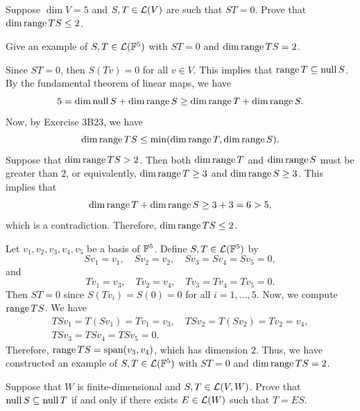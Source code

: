 \begin{exc}
\begin{exercise}\leavevmode
\begin{parts}
\item Suppose $\dim V=5$ and $S,T\in\mathcal{L}(V)$ are such that $ST=0$. Prove that
  $\operatorname{dim}\operatorname{range} TS\le2$.
\item Give an example of $S,T\in\mathcal{L}(\mathbb{F}^5)$ with $ST=0$ and
  $\operatorname{dim}\operatorname{range} TS=2$.
\end{parts}
\end{exercise}
\begin{solution}\leavevmode
\begin{parts}
\item Since $ST=0$, then $S(Tv)=0$ for all $v\in V$. This implies that
  $\operatorname{range} T\subseteq\operatorname{null} S$. By the fundamental theorem of linear maps, we have
  \[ 5=\operatorname{dim}\operatorname{null} S+\operatorname{dim}\operatorname{range} S\ge\operatorname{dim}\operatorname{range} T+\operatorname{dim}\operatorname{range} S. \]
  Now, by Exercise 3B23, we have
  \[ \operatorname{dim}\operatorname{range} TS\le\min(\operatorname{dim}\operatorname{range} T,\operatorname{dim}\operatorname{range} S). \]
  Suppose that $\operatorname{dim}\operatorname{range} TS>2$. Then both $\operatorname{dim}\operatorname{range} T$ and $\operatorname{dim}\operatorname{range} S$
  must be greater than $2$, or equivalently, $\operatorname{dim}\operatorname{range} T\ge3$ and
  $\operatorname{dim}\operatorname{range} S\ge3$. This implies that
  \[ \operatorname{dim}\operatorname{range} T+\operatorname{dim}\operatorname{range} S\ge3+3=6>5, \]
  which is a contradiction. Therefore, $\operatorname{dim}\operatorname{range} TS\le2$.
\item Let $v_1,v_2,v_3,v_4,v_5$ be a basis of $\mathbb{F}^5$. Define
  $S,T\in\mathcal{L}(\mathbb{F}^5)$ by
  \[ Sv_1=v_1, \quad Sv_2=v_2, \quad Sv_3=Sv_4=Sv_5=0, \]
  and
  \[ Tv_1=v_3, \quad Tv_2=v_4, \quad Tv_3=Tv_4=Tv_5=0. \]
  Then $ST=0$ since $S(Tv_i)=S(0)=0$ for all $i=1,\dots,5$. Now, we compute
  $\operatorname{range} TS$. We have
  \begin{gather*}
  TSv_1=T(Sv_1)=Tv_1=v_3, \quad TSv_2=T(Sv_2)=Tv_2=v_4,\\
  TSv_3=TSv_4=TSv_5=0.
  \end{gather*}
  Therefore, $\operatorname{range} TS=\operatorname{span}(v_3,v_4)$, which has dimension $2$. Thus, we have
  constructed an example of $S,T\in\mathcal{L}(\mathbb{F}^5)$ with $ST=0$ and
  $\operatorname{dim}\operatorname{range} TS=2$.
\end{parts}
\end{solution}

\begin{exercise}
Suppose that $W$ is finite-dimensional and $S,T\in\mathcal{L}(V,W)$. Prove that
$\operatorname{null} S\subseteq\operatorname{null} T$ if and only if there exists $E\in\mathcal{L}(W)$ such that
$T=ES$.
\end{exercise}
\begin{solution}


\end{solution}
\end{exc}

